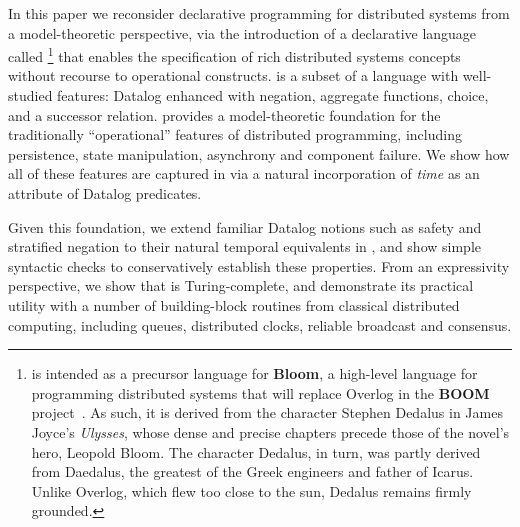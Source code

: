 In this paper we reconsider declarative programming for distributed systems from a model-theoretic perspective, via the introduction of a declarative language called \lang\footnote{\small
\lang is intended as a precursor language for \textbf{Bloom}, a high-level language for programming distributed systems that
will replace Overlog in the \textbf{BOOM} project~\cite{boom-techr}.  
As such, it is derived from the character Stephen Dedalus in James Joyce's \emph{Ulysses}, whose dense and precise chapters 
precede those of the novel's hero, Leopold Bloom.  The character Dedalus, in turn, was partly derived from Daedalus, the greatest
of the Greek engineers and father of Icarus.  Unlike Overlog, which flew too close to the sun, Dedalus remains firmly grounded.
} that enables the specification of rich distributed systems concepts without recourse to operational constructs.   \lang is a subset of a language with well-studied features: Datalog enhanced with negation, aggregate functions, choice, and a successor relation.  \lang provides a model-theoretic foundation for the traditionally ``operational'' features of distributed programming, including persistence, state manipulation, asynchrony and component failure.  We show how all of these features are captured in \lang via a natural incorporation of {\em time} as an attribute of Datalog predicates.

Given this foundation, we extend familiar Datalog notions such as safety and stratified negation to their natural temporal equivalents in \lang, and show simple syntactic checks to conservatively establish these properties.  
From an expressivity perspective, we show that \lang is Turing-complete, and demonstrate its practical utility with a number of building-block routines from classical distributed computing, including queues, distributed clocks, reliable broadcast and consensus.

